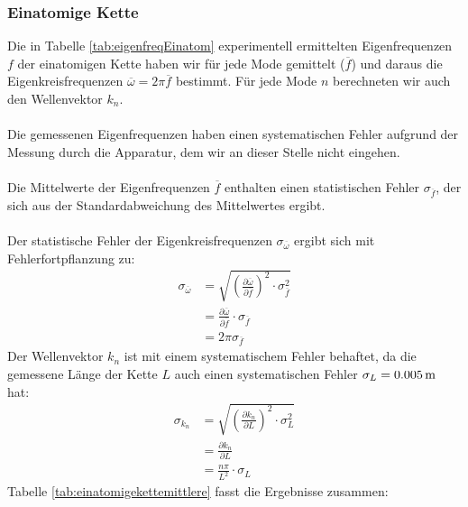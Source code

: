 \documentclass[a4paper,titlepage]{scrartcl}
\numberwithin{equation}{section}
\begin{document}
\subsubsection{Einatomige Kette}
Die in Tabelle \ref{tab:eigenfreqEinatom} experimentell ermittelten Eigenfrequenzen $f$ der einatomigen Kette haben wir für jede Mode gemittelt ($\overline{f}$) und daraus die Eigenkreisfrequenzen $\overline{\omega}=2 \pi \overline{f}$ bestimmt. Für jede Mode $n$ berechneten wir auch den Wellenvektor $k_n$.\\ \\
Die gemessenen Eigenfrequenzen haben einen systematischen Fehler aufgrund der Messung durch die Apparatur, dem wir an dieser Stelle nicht eingehen.\\ \\
Die Mittelwerte der Eigenfrequenzen $\overline{f}$ enthalten einen statistischen Fehler $\sigma_{\overline{f}}$, der sich aus der Standardabweichung des Mittelwertes ergibt.\\ \\
Der statistische Fehler der Eigenkreisfrequenzen $\sigma_{\overline{\omega}}$ ergibt sich mit Fehlerfortpflanzung zu:
\begin{align*}
\sigma_{\overline{\omega}}&=\sqrt{\left( \frac{\partial \overline{\omega}}{\partial \overline{f}} \right)^2 \cdot \sigma^2_{\overline{f}}}\\
&=\frac{\partial \overline{\omega}}{\partial \overline{f}} \cdot \sigma_{\overline{f}}\\
&=2 \pi \sigma_{\overline{f}}
\end{align*}
Der Wellenvektor $k_n$ ist mit einem systematischem Fehler behaftet, da die gemessene Länge der Kette $L$ auch einen systematischen Fehler $\sigma_L=\unit[0.005]{m}$ hat:
\begin{align*}
\sigma_{k_n}&=\sqrt{\left( \frac{\partial k_n}{\partial L} \right)^2 \cdot \sigma^2_L}\\
&=\frac{\partial k_n}{\partial L}\\
&=\frac{n \pi}{L^2} \cdot \sigma_L
\end{align*}
Tabelle \ref{tab:einatomigekettemittlere} fasst die Ergebnisse zusammen:
\end{document}
